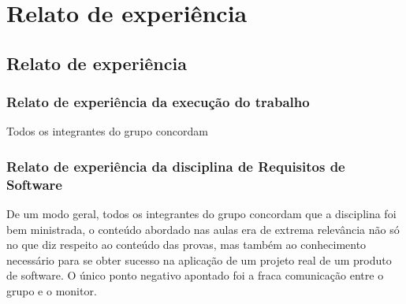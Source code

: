 \part{Relato de experiência}
\chapter[Relato de experiência]{Relato de experiência}

\section{Relato de experiência da execução do trabalho}

Todos os integrantes do grupo concordam 

\section{Relato de experiência da disciplina de Requisitos de Software}

De um modo geral, todos os integrantes do grupo concordam que a disciplina foi bem ministrada, o conteúdo abordado nas aulas era de extrema relevância não só no que diz respeito ao conteúdo das provas, mas também ao conhecimento necessário para se obter sucesso na aplicação de um projeto real de um produto de software. O único ponto negativo apontado foi a fraca comunicação entre o grupo e o monitor.
